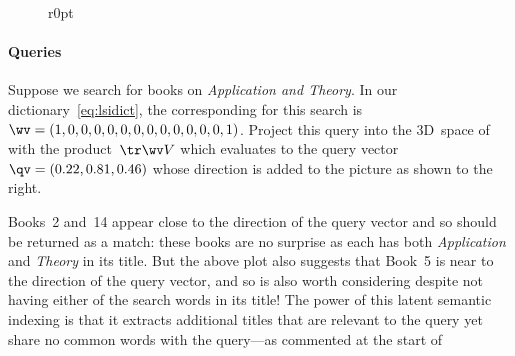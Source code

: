 \begin{figure}r{0pt}  \end{figure}
\paragraph{Queries}
Suppose we search for books on \emph{Application and Theory}.
In our dictionary~\eqref{eq:lsidict}, the corresponding  for this search is \(\wv=(1,0,0,0,0,0,0,0,0,0,0,0,0,1)\).
Project this query into the 3D~space of  with the product~\(\tr\wv V\) which evaluates to the query vector \(\qv=(0.22,0.81,0.46)\) whose direction is added to the picture as shown to the right.

Books~2 and~14 appear close to the direction of the query vector and so should be returned as a match: these books are no surprise as each has both \emph{Application} and \emph{Theory} in its title.
But the above plot also suggests that Book~5 is near to the direction of the query vector, and so is also worth considering despite not having either of the search words in its title!
The power of this latent semantic indexing is that it extracts additional titles that are relevant to the query yet share no common words with the query---as commented at the start of 

